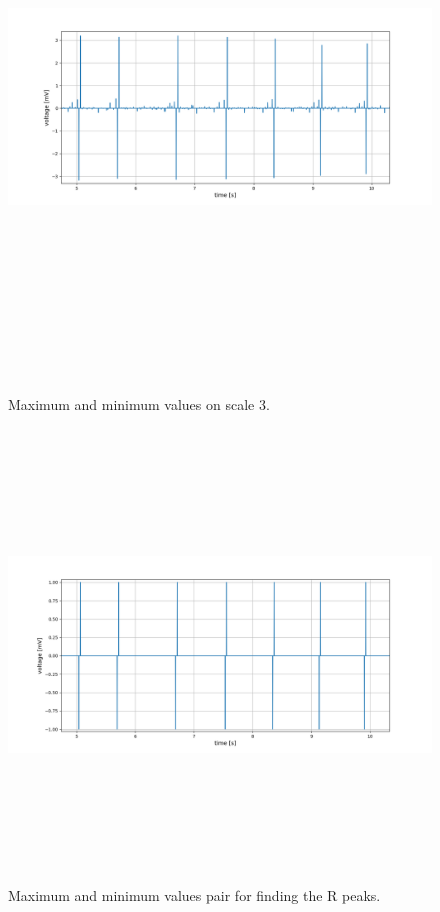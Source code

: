 \begin{figure}[]
	\centering
	\includegraphics[width=15cm,height=15cm,keepaspectratio=true]{images/maximas_on_level_3}
	\caption{
		Maximum and minimum values on scale 3.
	}
	\label{fig:maximas_on_level_3}
\end{figure}

\begin{figure}[htpb]
	\centering
	\includegraphics[width=15cm,height=12cm,keepaspectratio=true]{images/max_pair}
	\caption{
		Maximum and minimum values pair for finding the R peaks.
	}
	\label{fig:max_pair}
\end{figure}


